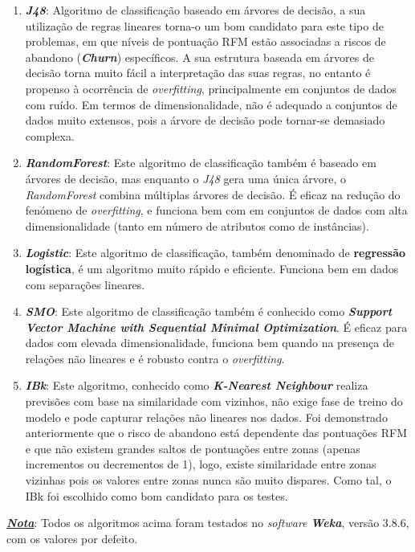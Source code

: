 \documentclass{easychair}
\begin{document}
\begin{enumerate}
	\item \textit{\textbf{J48}}: Algoritmo de classificação baseado em árvores de decisão, a sua utilização de regras lineares torna-o um bom candidato para este tipo de problemas, em que níveis de pontuação RFM estão associadas a riscos de abandono (\textit{\textbf{Churn}}) específicos. A sua estrutura baseada em árvores de decisão torna muito fácil a interpretação das suas regras, no entanto é propenso à ocorrência de \textit{overfitting}, principalmente em conjuntos de dados com ruído. Em termos de dimensionalidade, não é adequado a conjuntos de dados muito extensos, pois a árvore de decisão pode tornar-se demasiado complexa.
	\item \textit{\textbf{RandomForest}}: Este algoritmo de classificação também é baseado em árvores de decisão, mas enquanto o \textit{J48} gera uma única árvore, o \textit{RandomForest} combina múltiplas árvores de decisão. É eficaz na redução do fenómeno de \textit{overfitting}, e funciona bem com em conjuntos de dados com alta dimensionalidade (tanto em número de atributos como de instâncias).
	\item \textit{\textbf{Logistic}}: Este algoritmo de classificação, também denominado de \textbf{regressão logística}, é um algoritmo muito rápido e eficiente. Funciona bem em dados com separações lineares.
	\item \textit{\textbf{SMO}}: Este algoritmo de classificação também é conhecido como \textit{\textbf{Support Vector Machine with Sequential Minimal Optimization}}. É eficaz para dados com elevada dimensionalidade, funciona bem quando na presença de relações não lineares e é robusto contra o \textit{overfitting}.
	\item \textit{\textbf{IBk}}: Este algoritmo, conhecido como \textit{\textbf{K-Nearest Neighbour}} realiza previsões com base na similaridade com vizinhos, não exige fase de treino do modelo e pode capturar relações não lineares nos dados. Foi demonstrado anteriormente que o risco de abandono está dependente das pontuações RFM e que não existem grandes saltos de pontuações entre zonas (apenas incrementos ou decrementos de 1), logo, existe similaridade entre zonas vizinhas pois os valores entre zonas nunca são muito dispares. Como tal, o IBk foi escolhido como bom candidato para os testes.
\end{enumerate}

\underline{\textit{\textbf{Nota}}}: Todos os algoritmos acima foram testados no \textit{software} \textit{\textbf{Weka}}, versão 3.8.6, com os valores por defeito.
\end{document}
